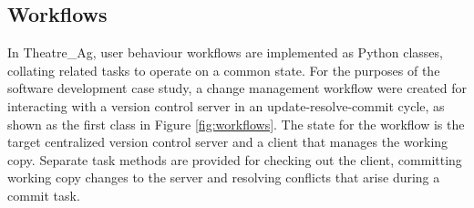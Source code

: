 \documentclass{llncs}
\begin{document}

\subsection{Workflows}


In Theatre\_Ag, user behaviour workflows are implemented as Python classes, collating related tasks to operate on a
common state. For the purposes of the software development case study, a change management workflow were created for
interacting with a version control server in an update-resolve-commit cycle, as shown as the first class in Figure
\ref{fig:workflows}.  The state for the workflow is the target centralized version control server and a client that
manages the working copy.  Separate task methods are provided for checking out the client, committing working copy
changes to the server and resolving conflicts that arise during a commit task.
\end{document}
